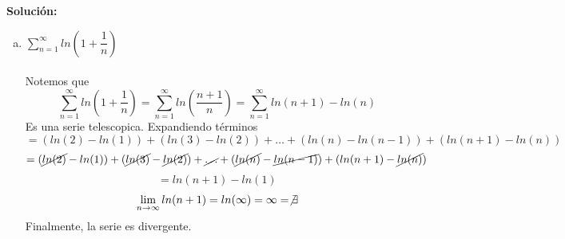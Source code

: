 \documentclass[12pt]{article}
\newenvironment{solucion}
{\begin{mdframed}[backgroundcolor=black!10]
		{\bf Solución:}\\
	}
	{
	\end{mdframed}
}
\newenvironment{preguntas}
{\begin{enumerate}\itemsep12pt
	}
	{
	\end{enumerate}
}
\newcommand{\ra}{\rightarrow}
\begin{document}
\begin{preguntas}
\begin{solucion}
\begin{enumerate}[a)]
\item  $\sum\limits_{n=1}^{\infty}ln\left(1+\dfrac{1}{n}\right)$\\
			\\
			Notemos que
			$$\sum\limits_{n=1}^{\infty} ln\left(1+\dfrac{1}{n}\right)
			= \sum\limits_{n=1}^{\infty} ln\left(\dfrac{n+1}{n}\right)
			= \sum\limits_{n=1}^{\infty} ln(n+1)-ln(n)$$
			Es una serie telescopica. Expandiendo términos
			$$= (ln(2)-ln(1)) + (ln(3)-ln(2)) + \dots + (ln(n) - ln(n-1)) + (ln(n+1) - ln(n))$$
			$$= (\cancel{ln(2)}-ln(1)) + (\cancel{ln(3)}-\cancel{ln(2)}) + \cancel{\dots} + (\cancel{ln(n)} - \cancel{ln(n-1)}) + (ln(n+1) - \cancel{ln(n)})$$
			$$= ln(n+1) - ln(1)$$
			$$\lim\limits_{n \ra \infty} ln(n+1) = ln(\infty) = \infty = \not \exists$$
			Finalmente, la serie es divergente.
\end{enumerate}
\end{solucion}
\end{preguntas}
\end{document}
